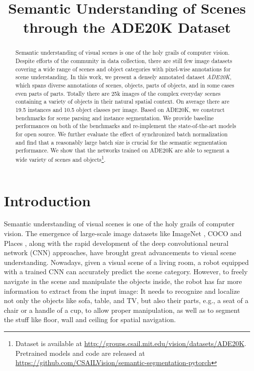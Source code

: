 \title{Semantic Understanding of Scenes through the ADE20K Dataset}

\begin{abstract}
Semantic understanding of visual scenes is one of the holy grails of computer vision. Despite efforts of the community in data collection, there are still few image datasets covering a wide range of scenes and object categories with pixel-wise annotations for scene understanding. In this work, we present a densely annotated dataset \textit{ADE20K}, which spans diverse annotations of scenes, objects, parts of objects, and in some cases even parts of parts. Totally there are 25k images of the complex everyday scenes containing a variety of objects in their natural spatial context. On average there are 19.5 instances and 10.5 object classes per image. Based on ADE20K, we construct benchmarks for scene parsing and instance segmentation. We provide baseline performances on both of the benchmarks and re-implement the state-of-the-art models for open source. We further evaluate the effect of synchronized batch normalization and find that a reasonably large batch size is crucial for the semantic segmentation performance. We show that the networks trained on ADE20K are able to segment a wide variety of scenes and objects\footnote{Dataset is available at \url{http://groups.csail.mit.edu/vision/datasets/ADE20K}. \\Pretrained models and code are released at \url{https://github.com/CSAILVision/semantic-segmentation-pytorch}}.

\end{abstract}

\section{Introduction}

Semantic understanding of visual scenes is one of the holy grails of computer vision. The emergence of large-scale image datasets like ImageNet \cite{ILSVRC15}, COCO \cite{lin2014microsoft} and Places \cite{zhou2014learning}, along with the rapid development of the deep convolutional neural network (CNN) approaches, have brought great advancements to visual scene understanding. Nowadays, given a visual scene of a living room, a robot equipped with a trained CNN can accurately predict the scene category. However, to freely navigate in the scene and manipulate the objects inside, the robot has far more information to extract from the input image: It needs to recognize and localize not only the objects like sofa, table, and TV, but also their parts, e.g., a seat of a chair or a handle of a cup, to allow proper manipulation, as well as to segment the stuff like floor, wall and ceiling for spatial navigation.

